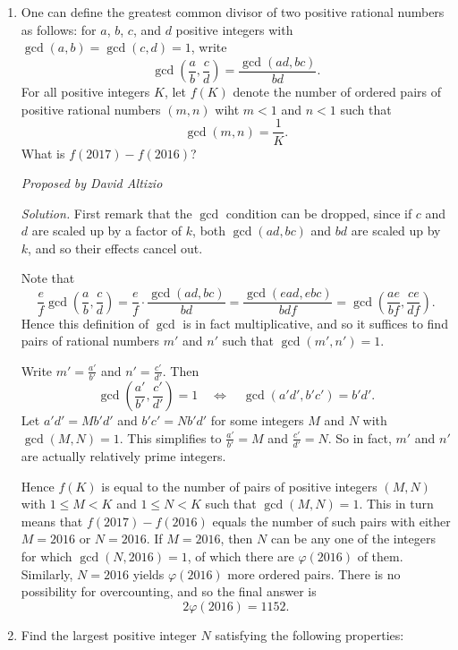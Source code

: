 \documentclass[10pt]{article}
\newcommand{\proposed}[1]
{
\vspace{5pt}
\noindent\textit{Proposed by #1}
}
\newcommand{\solution}
{
\vspace{5pt}
\noindent\textit{Solution.}\qquad
}
\begin{document}
\begin{enumerate}
	\item One can define the greatest common divisor of two positive rational numbers as follows: for $a$, $b$, $c$, and $d$ positive integers with $\gcd(a,b)=\gcd(c,d)=1$, write \[\gcd\left(\dfrac ab,\dfrac cd\right) = \dfrac{\gcd(ad,bc)}{bd}.\] For all positive integers $K$, let $f(K)$ denote the number of ordered pairs of positive rational numbers $(m,n)$ wiht $m<1$ and $n<1$ such that \[\gcd(m,n)=\dfrac{1}{K}.\] What is $f(2017)-f(2016)$?

\proposed{David Altizio}

\solution First remark that the $\gcd$ condition can be dropped, since if $c$ and $d$ are scaled up by a factor of $k$, both $\gcd(ad,bc)$ and $bd$ are scaled up by $k$, and so their effects cancel out.

\par  Note that \[\dfrac ef\gcd\left(\dfrac ab,\dfrac cd\right) = \dfrac{e}{f}\cdot\dfrac{\gcd(ad,bc)}{bd} = \dfrac{\gcd(ead, ebc)}{bdf} = \gcd\left(\dfrac{ae}{bf},\dfrac{ce}{df}\right).\] Hence this definition of $\gcd$ is in fact multiplicative, and so it suffices to find pairs of rational numbers $m'$ and $n'$ such that $\gcd(m',n')=1$.

\par Write $m'=\tfrac{a'}{b'}$ and $n'=\tfrac{c'}{d'}$.  Then \[\gcd\left(\dfrac{a'}{b'},\dfrac{c'}{d'}\right) = 1\quad\iff\quad \gcd(a'd',b'c') = b'd'.\] Let $a'd' = Mb'd'$ and $b'c' = Nb'd'$ for some integers $M$ and $N$ with $\gcd(M,N) = 1$.  This simplifies to $\tfrac{a'}{b'} = M$ and $\tfrac{c'}{d'} = N$.  So in fact, $m'$ and $n'$ are actually relatively prime integers.

\par Hence $f(K)$ is equal to the number of pairs of positive integers $(M,N)$ with $1\leq M < K$ and $1\leq N < K$ such that $\gcd(M,N) = 1$.  This in turn means that $f(2017) - f(2016)$ equals the number of such pairs with either $M=2016$ or $N=2016$.  If $M = 2016$, then $N$ can be any one of the integers for which $\gcd(N, 2016) = 1$, of which there are $\varphi(2016)$ of them.  Similarly, $N=2016$ yields $\varphi(2016)$ more ordered pairs.  There is no possibility for overcounting, and so the final answer is \[2\varphi(2016) = \boxed{1152}.\]

	\item Find the largest positive integer $N$ satisfying the following properties:

\begin{itemize}


\end{itemize}
\end{enumerate}
\end{document}
